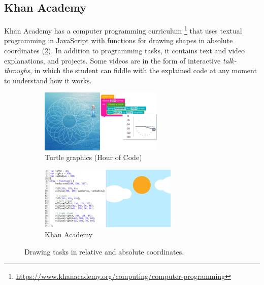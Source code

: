 
\subsection{Khan Academy}
\label{sec:khan-academy}
Khan Academy has a computer programming curriculum%
\footnote{\url{https://www.khanacademy.org/computing/computer-programming}}
that uses textual programming in JavaScript with functions for drawing shapes
in absolute coordinates
(\cref{fig:ka}).
In addition to programming tasks, it contains text and video explanations, and
projects. Some videos are in the form of interactive \emph{talk-throughs},
in which the student can fiddle with the explained code at any moment to understand
how it works.



\begin{figure}[htb]
\centering

\begin{subfigure}[t]{0.48\textwidth}
\centering
\includegraphics[height=30mm]{img/hoc-turtle2}
\caption{Turtle graphics (Hour of Code)}
\label{fig:turtle}
\end{subfigure}%
\begin{subfigure}[t]{0.52\textwidth}
\centering
\includegraphics[height=30mm]{img/khan-academy}
\caption{Khan Academy}
\label{fig:ka}
\end{subfigure}
\caption{Drawing tasks in relative and absolute coordinates.}
\label{fig:hrm-ka}
\end{figure}






